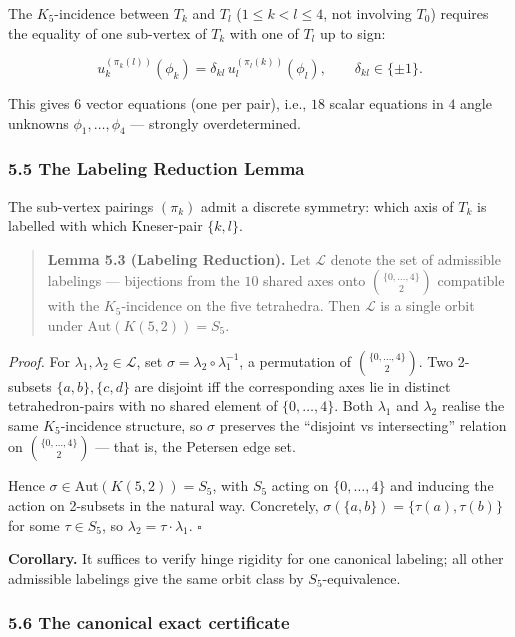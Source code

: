 \documentclass[
]{article}
\begin{document}
The \(K_5\)-incidence between \(T_k\) and \(T_l\)
(\(1 \le k < l \le 4\), not involving \(T_0\)) requires the equality of
one sub-vertex of \(T_k\) with one of \(T_l\) up to sign:

\[
u_k^{(\pi_k(l))}(\phi_k) = \delta_{kl}\,u_l^{(\pi_l(k))}(\phi_l),
\qquad \delta_{kl} \in \{\pm 1\}.
\]

This gives \(6\) vector equations (one per pair), i.e., \(18\) scalar
equations in \(4\) angle unknowns \(\phi_1,\ldots,\phi_4\) --- strongly
overdetermined.

\subsubsection{5.5 The Labeling Reduction
Lemma}\label{the-labeling-reduction-lemma}

The sub-vertex pairings \((\pi_k)\) admit a discrete symmetry: which
axis of \(T_k\) is labelled with which Kneser-pair \(\{k,l\}\).

\begin{quote}
\textbf{Lemma 5.3 (Labeling Reduction).} Let \(\mathcal{L}\) denote the
set of admissible labelings --- bijections from the \(10\) shared axes
onto \(\binom{\{0,\dots,4\}}{2}\) compatible with the \(K_5\)-incidence
on the five tetrahedra. Then \(\mathcal{L}\) is a single orbit under
\(\mathrm{Aut}(K(5,2)) = S_5\).
\end{quote}

\emph{Proof.} For \(\lambda_1, \lambda_2 \in \mathcal{L}\), set
\(\sigma = \lambda_2 \circ \lambda_1^{-1}\), a permutation of
\(\binom{\{0,\ldots,4\}}{2}\). Two 2-subsets \(\{a,b\}, \{c,d\}\) are
disjoint iff the corresponding axes lie in distinct tetrahedron-pairs
with no shared element of \(\{0,\ldots,4\}\). Both \(\lambda_1\) and
\(\lambda_2\) realise the same \(K_5\)-incidence structure, so
\(\sigma\) preserves the ``disjoint vs intersecting'' relation on
\(\binom{\{0,\ldots,4\}}{2}\) --- that is, the Petersen edge set.

Hence \(\sigma \in \mathrm{Aut}(K(5,2)) = S_5\), with \(S_5\) acting on
\(\{0,\ldots,4\}\) and inducing the action on 2-subsets in the natural
way. Concretely, \(\sigma(\{a,b\}) = \{\tau(a),\tau(b)\}\) for some
\(\tau \in S_5\), so \(\lambda_2 = \tau \cdot \lambda_1\). \(\square\)

\textbf{Corollary.} It suffices to verify hinge rigidity for one
canonical labeling; all other admissible labelings give the same orbit
class by \(S_5\)-equivalence.

\subsubsection{5.6 The canonical exact
certificate}\label{the-canonical-exact-certificate}
\end{document}
